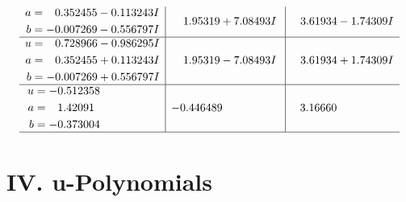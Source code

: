 \documentclass[1p]{elsarticle_modified}
\theoremstyle{definition}
\begin{document}
$$\begin{array}{c|c|c}
\begin{aligned}
a &= \phantom{-}0.352455 - 0.113243 I \\
b &= -0.007269 - 0.556797 I\end{aligned}
 & \phantom{-}1.95319 + 7.08493 I & \phantom{-}3.61934 - 1.74309 I \\ \hline\begin{aligned}
u &= \phantom{-}0.728966 - 0.986295 I \\
a &= \phantom{-}0.352455 + 0.113243 I \\
b &= -0.007269 + 0.556797 I\end{aligned}
 & \phantom{-}1.95319 - 7.08493 I & \phantom{-}3.61934 + 1.74309 I \\ \hline\begin{aligned}
u &= -0.512358\phantom{ +0.000000I} \\
a &= \phantom{-}1.42091\phantom{ +0.000000I} \\
b &= -0.373004\phantom{ +0.000000I}\end{aligned}
 & -0.446489\phantom{ +0.000000I} & \phantom{-}3.16660\phantom{ +0.000000I}\\
 \hline 
 \end{array}$$\newpage
\newpage\renewcommand{\arraystretch}{1}
\centering \section*{ IV. u-Polynomials}
\end{document}
